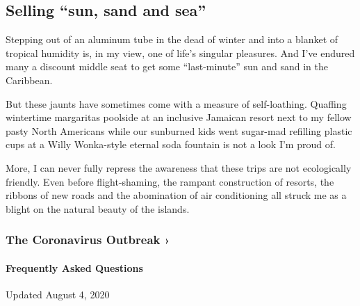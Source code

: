 \hypertarget{selling-sun-sand-and-sea}{%
\subsection{Selling ``sun, sand and
sea''}\label{selling-sun-sand-and-sea}}

Stepping out of an aluminum tube in the dead of winter and into a
blanket of tropical humidity is, in my view, one of life's singular
pleasures. And I've endured many a discount middle seat to get some
``last-minute'' sun and sand in the Caribbean.

But these jaunts have sometimes come with a measure of self-loathing.
Quaffing wintertime margaritas poolside at an inclusive Jamaican resort
next to my fellow pasty North Americans while our sunburned kids went
sugar-mad refilling plastic cups at a Willy Wonka-style eternal soda
fountain is not a look I'm proud of.

More, I can never fully repress the awareness that these trips are not
ecologically friendly. Even before flight-shaming, the rampant
construction of resorts, the ribbons of new roads and the abomination of
air conditioning all struck me as a blight on the natural beauty of the
islands.

\href{https://www.nytimes3xbfgragh.onion/news-event/coronavirus?action=click\&pgtype=Article\&state=default\&region=MAIN_CONTENT_3\&context=storylines_faq}{}

\hypertarget{the-coronavirus-outbreak-}{%
\subsubsection{The Coronavirus Outbreak
›}\label{the-coronavirus-outbreak-}}

\hypertarget{frequently-asked-questions}{%
\paragraph{Frequently Asked
Questions}\label{frequently-asked-questions}}

Updated August 4, 2020

